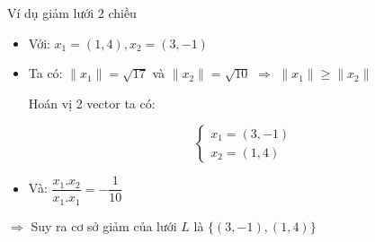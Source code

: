 \documentclass{beamer}
\numberwithin{equation}{section}
\begin{document}
\begin{frame}{Ví dụ giảm lưới 2 chiều}
\begin{itemize}

\item Với: $x_1 = (1, 4), x_2 = (3, -1)$
\item Ta có: $\|x_1\|= \sqrt{17}$ và $\|x_2\| = \sqrt{10}$ $\Rightarrow$ $\|x_1\| \geq \|x_2\|$

Hoán vị 2 vector ta có:

$$\begin{cases}
x_1 = (3, -1)\\
x_2 = (1, 4)
\end{cases}$$

\item Và: $\dfrac{x_1.x_2}{x_1.x_1} = -\dfrac{1}{10}$

\end{itemize}

$\Rightarrow$ Suy ra cơ sở giảm của lưới $L$ là $\{(3, -1), (1, 4)\}$

\end{frame}
\end{document}

